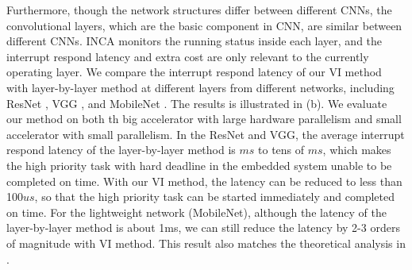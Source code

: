 Furthermore, though the network structures differ between different CNNs, the convolutional layers, which are the basic component in CNN, are similar between different CNNs. INCA monitors the running status inside each layer, and the interrupt respond latency and extra cost are only relevant to the currently operating layer. 
We compare the interrupt respond latency of our VI method with layer-by-layer method at different layers from different networks, including ResNet \cite{he2016deep}, VGG \cite{simonyan2014very}, and MobileNet \cite{howard2017mobilenets}. The results is illustrated in (b). We evaluate our method on both th big accelerator with large hardware parallelism and small accelerator with small parallelism. 
In the ResNet and VGG, the average interrupt respond latency of the layer-by-layer method is $ms$ to tens of $ms$, which makes the high priority task with hard deadline in the embedded system unable to be completed on time. With our VI method, the latency can be reduced to less than 100$us$, so that the high priority task can be started immediately and completed on time. 
For the lightweight network (MobileNet), although the latency of the layer-by-layer method is about 1ms, we can still reduce the latency by 2-3 orders of magnitude with VI method. This result also matches the theoretical analysis in .




% 



